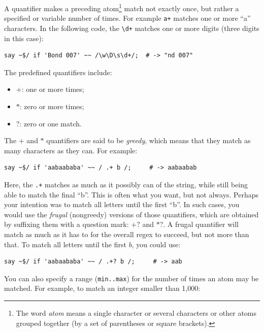 A quantifier makes a preceding atom\footnote{The 
word \emph{atom} means a single character or several 
characters or other atoms grouped together (by a set of 
parentheses or square brackets).} match not exactly once, 
but rather a specified or variable number of times.  For 
example \verb'a+' matches one or more ``a'' characters. In 
the following code, the \verb'\d+' matches one or more 
digits (three digits in this case):

\begin{verbatim}
say ~$/ if 'Bond 007' ~~ /\w\D\s\d+/;  # -> "nd 007"
\end{verbatim}
%

The predefined quantifiers include:
\begin{itemize}
\item $+$: one or more times;
\item $*$: zero or more times;
\item $?$: zero or one match.
\end{itemize}

The $+$ and $*$ quantifiers are said to be \emph{greedy}, 
which means that they match as many characters as they 
can. For example:

\begin{verbatim}
say ~$/ if 'aabaababa' ~~ / .+ b /;     # -> aabaabab
\end{verbatim}
%

Here, the \verb'.+' matches as much as it possibly can 
of the string, while still being able to match the final ``b''. 
This is often what you want, but not always. Perhaps your 
intention was to match all letters until the first ``b''. In 
such cases, you would use the \emph{frugal} (nongreedy) 
versions of those quantifiers, which are obtained by suffixing 
them with a question mark: $+?$ and $*?$. A frugal quantifier 
will match as much as it has to for the overall regex to succeed, 
but not more than that. To match all letters until the first $b$, 
you could use:

\begin{verbatim}
say ~$/ if 'aabaababa' ~~ / .+? b /;     # -> aab
\end{verbatim}
%

You can also specify a range ({\tt min..max}) for the number of 
times an atom may be matched. For example, to match an 
integer smaller than 1,000:

